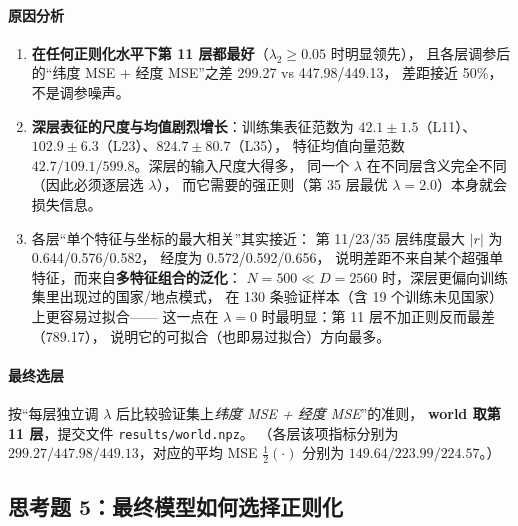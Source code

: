 \documentclass[UTF8,a4paper]{ctexart}
\begin{document}
\paragraph{原因分析}
\begin{enumerate}
  \item \textbf{在任何正则化水平下第 11 层都最好}（$\lambda_2\ge0.05$ 时明显领先），
  且各层调参后的“纬度 MSE + 经度 MSE”之差 299.27 vs 447.98/449.13，
  差距接近 50\%，不是调参噪声。
  \item \textbf{深层表征的尺度与均值剧烈增长}：训练集表征范数为
  $42.1\pm1.5$（L11）、$102.9\pm6.3$（L23）、$824.7\pm80.7$（L35），
  特征均值向量范数 $42.7/109.1/599.8$。深层的输入尺度大得多，
  同一个 $\lambda$ 在不同层含义完全不同（因此必须逐层选 $\lambda$），
  而它需要的强正则（第 35 层最优 $\lambda=2.0$）本身就会损失信息。
  \item 各层“单个特征与坐标的最大相关”其实接近：
  第 11/23/35 层纬度最大 $|r|$ 为 0.644/0.576/0.582，
  经度为 0.572/0.592/0.656，
  说明差距不来自某个超强单特征，而来自\textbf{多特征组合的泛化}：
  $N=500\ll D=2560$ 时，深层更偏向训练集里出现过的国家/地点模式，
  在 130 条验证样本（含 19 个训练未见国家）上更容易过拟合——
  这一点在 $\lambda=0$ 时最明显：第 11 层不加正则反而最差（789.17），
  说明它的可拟合（也即易过拟合）方向最多。
\end{enumerate}

\paragraph{最终选层}
按“每层独立调 $\lambda$ 后比较验证集上\emph{纬度 MSE + 经度 MSE}”的准则，
\textbf{world 取第 11 层}，提交文件 \texttt{results/}\allowbreak\texttt{world.npz}。
（各层该项指标分别为 $299.27/447.98/449.13$，对应的平均 MSE
$\tfrac{1}{2}(\cdot)$ 分别为 $149.64/223.99/224.57$。）

\subsection{思考题 5：最终模型如何选择正则化}
\end{document}
